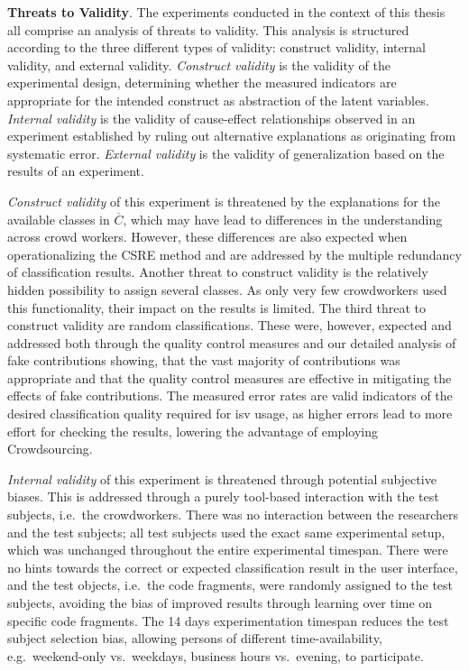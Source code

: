 \textbf{Threats to Validity}. The experiments conducted in the context of this thesis all comprise an analysis of threats to validity.
This analysis is structured according to the three different types of validity: construct validity, internal validity, and external validity.
\emph{Construct validity} is the validity of the experimental design, determining whether the measured indicators are appropriate for the intended construct as abstraction of the latent variables.
\emph{Internal validity} is the validity of cause-effect relationships observed in an experiment established by ruling out alternative explanations as originating from systematic error.
\emph{External validity} is the validity of generalization based on the results of an experiment.
\autocite{Creswell2014ResearchDesign}

\emph{Construct validity} of this experiment is threatened by the explanations for the available classes in \(\overline C\), which may have lead to differences in the understanding across crowd workers.
However, these differences are also expected when operationalizing the CSRE method and are addressed by the multiple redundancy of classification results.
Another threat to construct validity is the relatively hidden possibility to assign several classes.
As only very few crowdworkers used this functionality, their impact on the results is limited.
The third threat to construct validity are random classifications.
These were, however, expected and addressed both through the quality control measures and our detailed analysis of fake contributions showing, that the vast majority of contributions was appropriate and that the quality control measures are effective in mitigating the effects of fake contributions.
The measured error rates are valid indicators of the desired classification quality required for \gls{isv} usage, as higher errors lead to more effort for checking the results, lowering the advantage of employing \gls{Crowdsourcing}.

\emph{Internal validity} of this experiment is threatened through potential subjective biases.
This is addressed through a purely tool-based interaction with the test subjects, i.e.~the crowdworkers.
There was no interaction between the researchers and the test subjects; all test subjects used the exact same experimental setup, which was unchanged throughout the entire experimental timespan.
There were no hints towards the correct or expected classification result in the user interface, and the test objects, i.e.~the code fragments, were randomly assigned to the test subjects, avoiding the bias of improved results through learning over time on specific code fragments.
The 14 days experimentation timespan reduces the test subject selection bias, allowing persons of different time-availability, e.g.~weekend-only vs.~weekdays, business hours vs.~evening, to participate.

